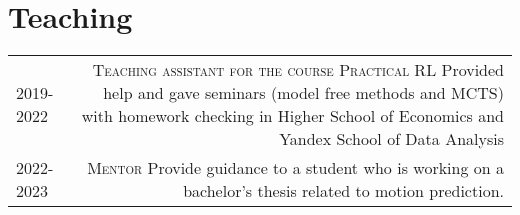 \section*{\sectionformat Teaching}
\begin{tabular}{@{}L!{\VRule}R}
    2019-2022  {} &
    {\textsc{Teaching assistant for the course Practical RL}} Provided help and gave seminars (model free methods and MCTS) with homework checking in Higher School of Economics and Yandex School of Data Analysis
\\
    2022-2023 {} 
    & {\textsc{Mentor}} Provide guidance to a student who is working on a bachelor's thesis related to motion prediction.
\end{tabular}
